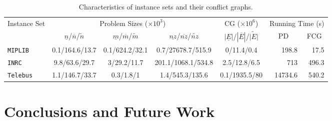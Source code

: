 \documentclass{endm}
\begin{document}
\begin{table}[h]
\scriptsize
\caption{Characteristics of instance sets and their conflict graphs.}\label{tab:inst}
\begin{center}
\begin{tabular}{|l|c|c|c|c|r|r|}
\hline 
\multirow{2}{0.8cm}{Instance Set} & \multicolumn{3}{c|}{{Problem Sizes ($\times10^{3}$)}} & {CG ($\times10^{6}$)} & \multicolumn{2}{c|}{{Running Time (s)}}\tabularnewline
\cline{2-7} 
 & {$\underline{n}$/$\overline{n}$/$\tilde{n}$} & {$\underline{m}$/$\overline{m}$/$\tilde{m}$} & {$\underline{nz}$/$\overline{nz}$/$\tilde{nz}$} & {$|\underline{E}|$/$|\overline{E}|$/$\tilde{|E|}$} & \multicolumn{1}{c|}{PD} & \multicolumn{1}{c|}{FCG}\tabularnewline
\hline 
\hline 
\texttt{MIPLIB} & {0.1/164.6/13.7} & {0.1/624.2/32.1} & {0.7/27678.7/515.9} & {0/11.4/0.4} & {198.8} & {17.5}\tabularnewline
\hline 
\texttt{INRC} & {9.8/63.6/29.7} & {3/29.2/11.7} & {201.1/1068.1/534.8} & {2.5/12.8/6.5} & {713} & {496.3}\tabularnewline
\hline 
\texttt{Telebus} & {1.1/146.7/33.7} & {0.3/1.8/1} & {1.4/545.3/135.6} & {0.1/1935.5/80} & {14734.6} & {540.2}\tabularnewline
\hline 
\end{tabular}
\end{center}
\end{table}



\section{Conclusions and Future Work}\label{conclusions}



\end{document}
